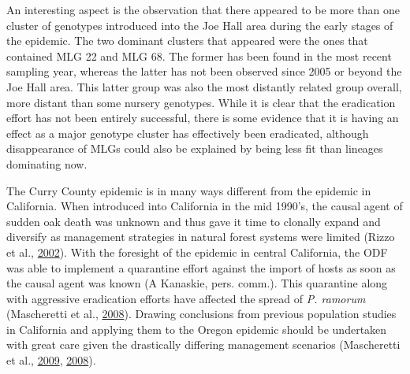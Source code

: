 \documentclass[double,11pt]{beavtex}
\begin{document}
  An interesting aspect is the observation that there appeared to be more
  than one cluster of genotypes introduced into the Joe Hall area during
  the early stages of the epidemic. The two dominant clusters that
  appeared were the ones that contained MLG 22 and MLG 68. The former has
  been found in the most recent sampling year, whereas the latter has not
  been observed since 2005 or beyond the Joe Hall area. This latter group
  was also the most distantly related group overall, more distant than
  some nursery genotypes. While it is clear that the eradication effort
  has not been entirely successful, there is some evidence that it is
  having an effect as a major genotype cluster has effectively been
  eradicated, although disappearance of MLGs could also be explained by
  being less fit than lineages dominating now.
  
  The Curry County epidemic is in many ways different from the epidemic in
  California. When introduced into California in the mid 1990's, the
  causal agent of sudden oak death was unknown and thus gave it time to
  clonally expand and diversify as management strategies in natural forest
  systems were limited (Rizzo et al.,
  \protect\hyperlink{ref-rizzo2002phytophthora}{2002}). With the foresight
  of the epidemic in central California, the ODF was able to implement a
  quarantine effort against the import of hosts as soon as the causal
  agent was known (A Kanaskie, pers. comm.). This quarantine along with
  aggressive eradication efforts have affected the spread of \emph{P.
  ramorum} (Mascheretti et al.,
  \protect\hyperlink{ref-mascheretti2008reconstruction}{2008}). Drawing
  conclusions from previous population studies in California and applying
  them to the Oregon epidemic should be undertaken with great care given
  the drastically differing management scenarios (Mascheretti et al.,
  \protect\hyperlink{ref-mascheretti2009genetic}{2009},
  \protect\hyperlink{ref-mascheretti2008reconstruction}{2008}).
  
\end{document}
